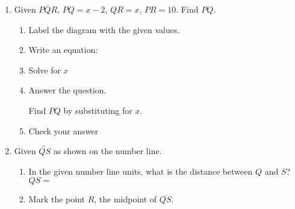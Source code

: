 \begin{enumerate}
\item Given $\overline{PQR}$, $PQ=x-2$, $QR=x$, $PR=10$. Find ${PQ}$.
  \begin{enumerate}
  \item Label the diagram with the given values.
  \begin{flushright}
  \end{flushright} \vspace{1cm}
  \item Write an equation: \vspace{1cm}
  \item Solve for $x$
  \vspace{3cm}
  \item Answer the question. \par
  Find $PQ$ by substituting for $x$. \vspace{1.5cm}
  \item Check your answer
  \end{enumerate}

\newpage
\item Given $\overleftrightarrow{QS}$ as shown on the number line. \\[20pt] %
   \bigskip
  \begin{enumerate}
    \item In the given number line units, what is the distance between $Q$ and $S$? \\[0.5cm]
    $QS=$
    \bigskip
    \item Mark the point $R$, the midpoint of $\overline{QS}$.
  \end{enumerate}\vspace{1cm}


\end{enumerate}
